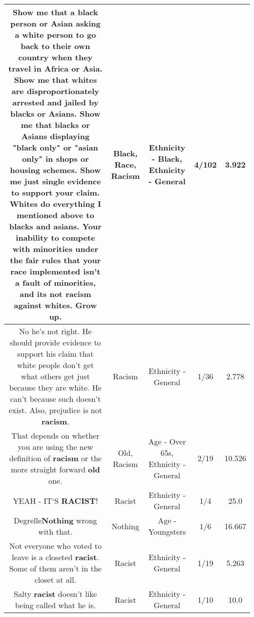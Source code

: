 \documentclass[11pt]{article}
\newlength\mylength
\begin{document}
\begin{center}
\begin{longtable}{|C{.65\mylength}|C{.30\mylength}|C{.12\mylength}|C{.12\mylength}|C{.12\mylength}|}
  \small Show me that a \textbf{black} person or Asian asking a white person to go back to their own country when they travel in Africa or Asia. Show me that whites are disproportionately arrested and jailed by blacks or Asians.  Show me that blacks or Asians displaying "\textbf{black} only" or "asian only" in shops or housing schemes. Show me just single evidence to support your claim. Whites do everything I mentioned above to blacks and asians. Your inability to compete with minorities under the fair rules that your \textbf{race} implemented isn't a fault of minorities, and its not \textbf{racism} against whites. Grow up.\normalsize   & Black, Race, Racism & Ethnicity - Black, Ethnicity - General & 4/102 & 3.922 \\  \hline
  \small No he's not right. He should provide evidence to support his claim that white people don't get what others get just because they are white. He can't because such doesn't exist. Also, prejudice is not \textbf{racism}.\normalsize   & Racism & Ethnicity - General & 1/36 & 2.778 \\  \hline
  \small That depends on whether you are using the new definition of \textbf{racism} or the more straight forward \textbf{old} one.\normalsize   & Old, Racism & Age - Over 65s, Ethnicity - General & 2/19 & 10.526 \\  \hline
  \small YEAH - IT`S \textbf{RACIST}!\normalsize   & Racist & Ethnicity - General & 1/4 & 25.0 \\  \hline
  \small {} Degrelle\textbf{Nothing} wrong with that.\normalsize   & Nothing & Age - Youngsters & 1/6 & 16.667 \\  \hline
  \small Not everyone who voted to leave is a closeted \textbf{racist}. Some of them aren't in the closet at all.\normalsize   & Racist & Ethnicity - General & 1/19 & 5.263 \\  \hline
  \small {} Salty \textbf{racist} doesn't like being called what he is.\normalsize   & Racist & Ethnicity - General & 1/10 & 10.0 \\  \hline

\end{longtable}
\end{center}
\end{document}
